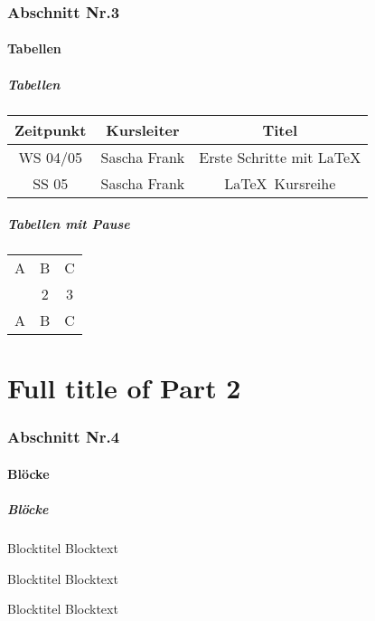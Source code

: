 \documentclass[aspectratio=1610, compress, bigger]{beamer}
\begin{document}
\section{Abschnitt Nr.3} 
\subsection{Tabellen}
\begin{frame}
\frametitle{Tabellen}
\begin{tabular}{|c|c|c|}
\hline
\textbf{Zeitpunkt} & \textbf{Kursleiter} & \textbf{Titel} \\
\hline
WS 04/05 & Sascha Frank &  Erste Schritte mit \LaTeX  \\
\hline
SS 05 & Sascha Frank & \LaTeX \ Kursreihe \\
\hline
\end{tabular}
\end{frame}

\backgroundgrey

\begin{frame}
\frametitle{Tabellen mit Pause}
\begin{tabular}{c c c}
A & B & C \\ 
\pause 
1 & 2 & 3 \\  
\pause 
A & B & C \\ 
\end{tabular} 
\end{frame}

\backgrounddefault

\part[Part 2]{Full title of Part 2}

\frame[plain]{\partpage}

\section{Abschnitt Nr.4}
\subsection{Bl\"ocke}
\begin{frame}\frametitle{Bl\"ocke}

\begin{block}{Blocktitel}
Blocktext 
\end{block}

\begin{exampleblock}{Blocktitel}
Blocktext 
\end{exampleblock}


\begin{alertblock}{Blocktitel}
Blocktext 
\end{alertblock}
\end{frame}
\end{document}
